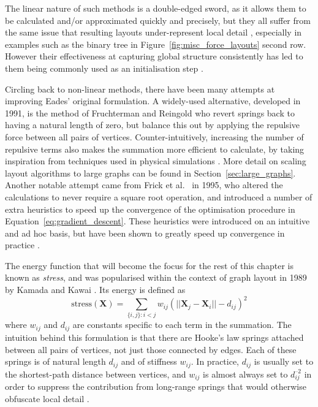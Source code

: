 The linear nature of such methods is a double-edged sword, as it allows them to be calculated and/or approximated quickly and precisely, but they all suffer from the same issue that resulting layouts under-represent local detail \cite{Brandes2008}, especially in examples such as the binary tree in Figure~\ref{fig:misc_force_layouts} second row. However their effectiveness at capturing global structure consistently has led to them being commonly used as an initialisation step \cite{Brandes2008, Dwyer2009}.

Circling back to non-linear methods, there have been many attempts at improving Eades' original formulation. A widely-used alternative, developed in 1991, is the method of Fruch\-terman and Reingold \cite{Fruchterman1991} who revert springs back to having a natural length of zero, but balance this out by applying the repulsive force between all pairs of vertices. Counter-intuitively, increasing the number of repulsive terms also makes the summation more efficient to calculate, by taking inspiration from techniques used in physical simulations \cite{Hachul2004, Hu2005}. More detail on scaling layout algorithms to large graphs can be found in Section~\ref{sec:large_graphs}.
Another notable attempt came from Frick et al.\ \cite{Frick1995} in 1995, who altered the calculations to never require a square root operation, and introduced a number of extra heuristics to speed up the convergence of the optimisation procedure in Equation~\eqref{eq:gradient_descent}. These heuristics were introduced on an intuitive and ad hoc basis, but have been shown to greatly speed up convergence in practice \cite{Brandes2001Physical}.

The energy function that will become the focus for the rest of this chapter is known as \emph{stress}, and was popularised within the context of graph layout in 1989 by Kamada and Kawai \cite{Kamada1989}. Its energy is defined as
\begin{equation}
  \mathrm{stress}(\mathbf{X}) = \sum_{\{i,j\}:i<j}w_{ij}(||\mathbf{X}_j-\mathbf{X}_i||-d_{ij})^2
\label{eq:stress}
\end{equation}
where $w_{ij}$ and $d_{ij}$ are constants specific to each term in the summation. The intuition behind this formulation is that there are Hooke's law springs attached between all pairs of vertices, not just those connected by edges. Each of these springs is of natural length $d_{ij}$ and of stiffness $w_{ij}$. In practice, $d_{ij}$ is usually set to the shortest-path distance between vertices, and $w_{ij}$ is almost always set to $d_{ij}^{\text{--}2}$ in order to suppress the contribution from long-range springs that would otherwise obfuscate local detail \cite{Brandes2008}.

